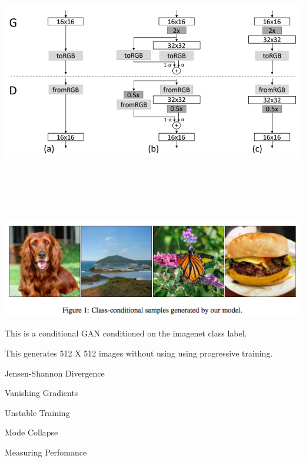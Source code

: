 {
\centerline{\includegraphics[height = 4.5in]{../images/GANprogc}}

\centerline{\includegraphics[width = 9in]{../images/GANclass}}

\vfill
This is a conditional GAN conditioned on the imagenet class label.

\vfill
This generates 512 X 512 images without using using progressive training.


\centerline{Jensen-Shannon Divergence}

\vfill
\centerline{Vanishing Gradients}

\vfill
\centerline{Unstable Training}

\vfill
\centerline{Mode Collapse}

\vfill
\centerline{Measuring Perfomance}




}
